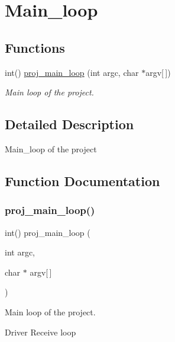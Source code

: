 \hypertarget{group__main__loop}{}\section{Main\+\_\+loop}
\label{group__main__loop}
\subsection*{Functions}
\begin{DoxyCompactItemize}
\item 
int() \hyperlink{group__main__loop_ga2a16f651eccbd248e1ad3b3b924b143b}{proj\+\_\+main\+\_\+loop} (int argc, char $\ast$argv\mbox{[}$\,$\mbox{]})
\begin{DoxyCompactList}\small\item\em Main loop of the project. \end{DoxyCompactList}\end{DoxyCompactItemize}


\subsection{Detailed Description}
Main\+\_\+loop of the project 

\subsection{Function Documentation}
\mbox{\label{group__main__loop_ga2a16f651eccbd248e1ad3b3b924b143b}} 
\subsubsection{\texorpdfstring{proj\+\_\+main\+\_\+loop()}{proj\_main\_loop()}}
{\footnotesize\ttfamily int() proj\+\_\+main\+\_\+loop (\begin{DoxyParamCaption}\item[{int}]{argc,  }\item[{char $\ast$}]{argv\mbox{[}$\,$\mbox{]} }\end{DoxyParamCaption})}



Main loop of the project. 

Driver Receive loop

